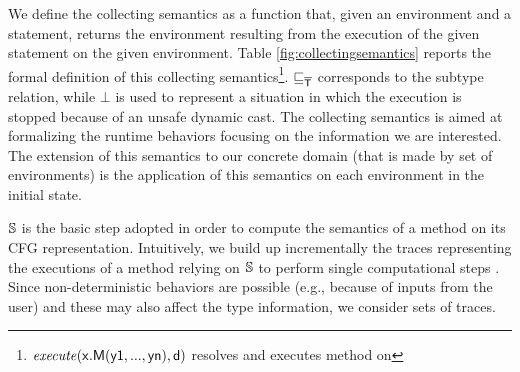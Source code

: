 \documentclass{llncs}
\begin{document}
We define the collecting semantics as a function that, given an environment and a statement, returns the environment resulting from the execution of the given statement on the given environment.  Table \ref{fig:collectingsemantics} reports the formal definition of this collecting semantics\footnote{$\mathit{execute}(\mathsf{x.M(y1, ..., yn)}, \mathsf{d})$ resolves and executes method  on }. $\sqsubseteq_{\mathsf{\overline{T}}}$ corresponds to the subtype relation, while $\bot$ is used to represent a situation in which the execution is stopped because of an unsafe dynamic cast. The collecting semantics is aimed at formalizing the runtime behaviors focusing on the information we are interested. The extension of this semantics to our concrete domain (that is made by set of environments) is the application of this semantics on each environment in the initial state.

$\mathit{\mathbb{S}}$ is the basic step adopted in order to compute the semantics of a method on its CFG representation. Intuitively, we build up incrementally the traces representing the executions of a method relying on $\mathit{\mathbb{S}}$ to perform single computational steps \cite{COU02}. Since non-deterministic behaviors are possible (e.g., because of inputs from the user) and these may also affect the type information, we consider sets of traces.
\end{document}
